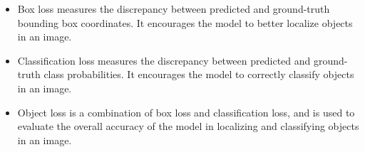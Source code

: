 \begin{itemize}
    \item Box loss measures the discrepancy between predicted and ground-truth bounding box coordinates. It encourages the model to better localize objects in an image.
    \item Classification loss measures the discrepancy between predicted and ground-truth class probabilities. It encourages the model to correctly classify objects in an image.
    \item Object loss is a combination of box loss and classification loss, and is used to evaluate the overall accuracy of the model in localizing and classifying objects in an image.
\end{itemize}


    

    